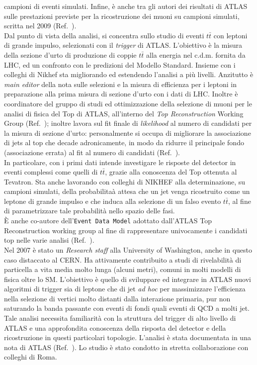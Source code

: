 \documentclass{article}
\begin{document}
\begin{vita}
campioni di eventi simulati. Infine, \`e anche tra gli autori
dei risultati di ATLAS sulle prestazioni previste per la ricostruzione
dei muoni su campioni simulati, scritta nel 2009 (Ref.~). \\
\newline
Dal punto di vista della analisi, si concentra sullo studio di eventi
$t\bar{t}$ con leptoni di grande impulso, selezionati con il {\it trigger}
di ATLAS. L'obiettivo \`e la misura della sezione d'urto di produzione
di coppie $t\bar{t}$ alla energia nel c.d.m. fornita da LHC, ed un confronto
con le predizioni del Modello Standard. Insieme con i colleghi di
Nikhef sta migliorando ed estendendo l'analisi a pi\`{u} livelli. Anzitutto \`e {\it main editor} della nota
sulle selezioni e la misura di efficienza per i leptoni in preparazione alla prima misura di sezione
d'urto con i dati di LHC. Inoltre \`e coordinatore
del gruppo di studi ed ottimizzazione della selezione di muoni per le analisi
di fisica del Top di ATLAS, all'interno del {\it Top Reconstruction} Working Group (Ref.~);
inoltre lavora sul fit finale di {\it likelihood} al numero di candidati per la misura di sezione d'urto:
personalmente si occupa di migliorare la associazione di jets al top
che decade adronicamente, in modo da ridurre il principale fondo
(associazione errata) al fit al numero di candidati (Ref.~). \\
In particolare, con i primi dati intende investigare le risposte del detector in eventi complessi
come quelli di $t\bar{t}$, grazie alla conoscenza del Top ottenuta al
Tevatron. Sta anche lavorando con colleghi di NIKHEF alla determinazione, su campioni
simulati, della probabilita\`a attesa che un jet venga ricostruito
come un leptone di grande impulso e che induca alla selezione di un
falso evento $t\bar{t}$, al fine di parametrizzare tale probabilit\`a
nello spazio delle fasi.\\
\`E anche co-autore dell'{\tt Event Data Model} adottato dall'ATLAS Top
Reconstruction working group al fine di rappresentare univocamente i
candidati top nelle varie analisi (Ref.~).\\
\newline 
Nel 2007 \`{e} stato un {\it Research staff} alla University of
Washington, anche in questo caso distaccato al CERN. Ha attivamente
contribuito a studi di rivelabilit\`a di particella a vita media molto
lunga (alcuni metri), comuni in molti modelli di fisica oltre lo
SM. L'obiettivo \`e quello di sviluppare ed integrare in ATLAS nuovi
algoritmi di trigger sia di leptone che di jet {\it ad hoc} per massimizzare l'efficienza nella
selezione di vertici molto distanti dalla interazione primaria, pur
non saturando la banda passante con eventi di fondi quali eventi di
QCD a molti jet. Tale analisi necessita familiarit\`a con la struttura
del trigger di alto livello di ATLAS e una approfondita conoscenza
della risposta del detector e della ricostruzione in questi
particolari topologie. L'analisi \`e stata documentata in una nota di
ATLAS (Ref.~).
Lo studio \`e stato condotto in stretta collaborazione con colleghi di Roma.\\


\end{vita}
\end{document}

